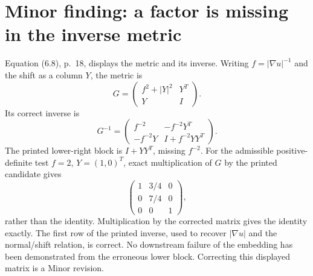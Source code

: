 \documentclass[10pt]{article}
\begin{document}
\section*{Minor finding: a factor is missing in the inverse metric}
Equation (6.8), p. 18, displays the metric and its inverse. Writing \(f=|\nabla u|^{-1}\) and the shift as a column \(Y\), the metric is \[G=\begin{pmatrix}f^2+|Y|^2&Y^T\\Y&I\end{pmatrix}.\] Its correct inverse is \[G^{-1}=\begin{pmatrix}
 f^{-2}&-f^{-2}Y^T\\
 -f^{-2}Y&I+f^{-2}YY^T
 \end{pmatrix}.\] The printed lower-right block is \(I+YY^T\), missing \(f^{-2}\). For the admissible positive-definite test \(f=2\), \(Y=(1,0)^T\), exact multiplication of \(G\) by the printed candidate gives \[\begin{pmatrix}1&3/4&0\\0&7/4&0\\0&0&1\end{pmatrix},\] rather than the identity. Multiplication by the corrected matrix gives the identity exactly. The first row of the printed inverse, used to recover \(|\nabla u|\) and the normal/shift relation, is correct. No downstream failure of the embedding has been demonstrated from the erroneous lower block. Correcting this displayed matrix is a Minor revision.\par
\end{document}
